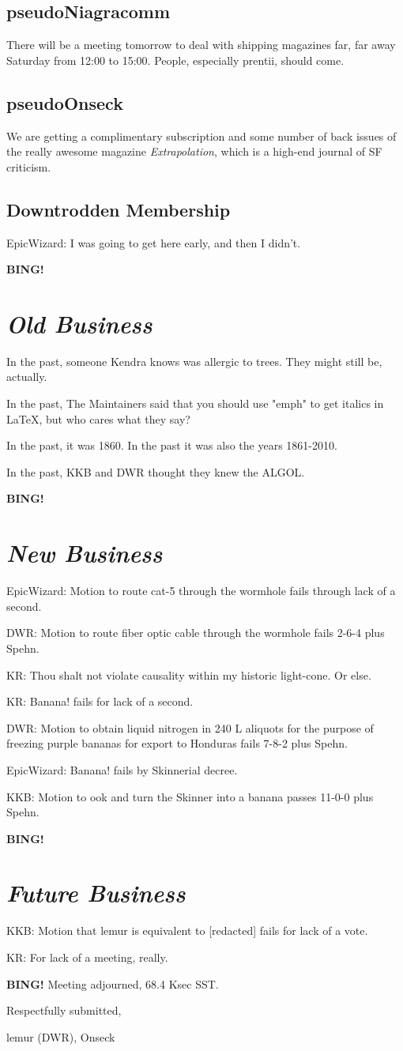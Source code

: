\documentclass[10pt]{article}
\newcommand{\bing}{{\bf BING!} }
\newcommand{\goto}[1]{\bing \vskip 12pt \section*{{\em{#1}}}}
\newcommand{\ps}{ plus Spehn\xspace}
\newcommand{\onseck}{lemur (DWR), Onseck}
\begin{document}
\subsection*{pseudoNiagracomm}

There will be a meeting tomorrow to deal with shipping magazines far, far away
Saturday from 12:00 to 15:00.  People, especially prentii, should come.

\subsection*{pseudoOnseck}

We are getting a complimentary subscription and some number of back issues
of the really awesome magazine \emph{Extrapolation}, which is a high-end
journal of SF criticism.

\subsection*{Downtrodden Membership}

EpicWizard: I was going to get here early, and then I didn't.

\goto{Old Business}

In the past, someone Kendra knows was allergic to trees.  They might still be,
actually.

In the past, The Maintainers said that you should use "emph" to get italics
in LaTeX, but who cares what they say?

In the past, it was 1860.  In the past it was also the years 1861-2010. 

In the past, KKB and DWR thought they knew the ALGOL.

\goto{New Business}

EpicWizard: Motion to route cat-5 through the wormhole fails through lack
of a second.

DWR: Motion to route fiber optic cable through the wormhole fails 2-6-4\ps.

KR: Thou shalt not violate causality within my historic light-cone.  Or else.

KR: Banana! fails for lack of a second.

DWR: Motion to obtain liquid nitrogen in 240 L aliquots for the purpose 
of freezing purple bananas for export to Honduras fails 7-8-2\ps.

EpicWizard: Banana! fails by Skinnerial decree.

KKB: Motion to ook and turn the Skinner into a banana passes 11-0-0\ps.

\goto{Future Business}

KKB: Motion that lemur is equivalent to [redacted] fails for lack of a vote.

KR: For lack of a meeting, really.

\bing
\noindent
Meeting adjourned, 68.4 Ksec SST.

\vspace{18pt}

\centerline{Respectfully submitted,}
\centerline{\onseck}
\end{document}
